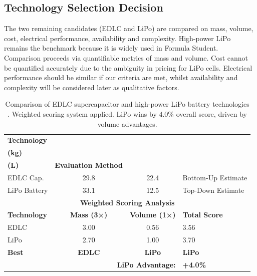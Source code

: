 \documentclass[11pt, a4paper]{report}
\numberwithin{equation}{section}
\begin{document}
\begin{refsection}
\subsection{Technology Selection Decision}

The two remaining candidates (EDLC and LiPo) are compared on mass, volume, cost, electrical performance, availability and complexity. High-power LiPo remains the benchmark because it is widely used in Formula Student. Comparison proceeds via quantifiable metrics of mass and volume. Cost cannot be quantified accurately due to the ambiguity in pricing for LiPo cells. Electrical performance should be similar if our criteria are met, whilst availability and complexity will be considered later as qualitative factors.


\begin{table}[htbp]
    \centering
    \caption{Comparison of EDLC supercapacitor and high-power LiPo battery technologies \cite{batpac2022manual}. Weighted scoring system applied. LiPo wins by 4.0\% overall score, driven by volume advantages.}
    \label{tab:tech_comparison}
    \footnotesize
    \begin{tabular}{|l|c|c|l|}
        \hline
        \textbf{Technology} & \makecell{\textbf{Mass*} \\ \textbf{(kg)}} & \makecell{\textbf{Cell Volume} \\ \textbf{(L)}} & \textbf{Evaluation Method} \\
        \hline
        EDLC Cap. & 29.8 & 22.4 & Bottom-Up Estimate \\
        \arrayrulecolor{gray!30}\hline\arrayrulecolor{black}
        LiPo Battery & 33.1 & 12.5 & Top-Down Estimate \\
        \hline
        \hline
        \multicolumn{4}{|c|}{\textbf{Weighted Scoring Analysis}} \\
        \hline
        \textbf{Technology} & \textbf{Mass (3×)} & \textbf{Volume (1×)} & \textbf{Total Score} \\
        \hline
        EDLC & 3.00 & 0.56 & 3.56 \\
        \arrayrulecolor{gray!30}\hline\arrayrulecolor{black}
        LiPo & 2.70 & 1.00 & 3.70 \\
        \hline
        \textbf{Best} & \textbf{EDLC} & \textbf{LiPo} & \cellcolor{green!20}\textbf{LiPo} \\
        \hline
        \multicolumn{3}{|r|}{\textbf{LiPo Advantage:}} & \textbf{+4.0\%} \\
        \hline
    \end{tabular}
\end{table}


\end{refsection}
\end{document}
